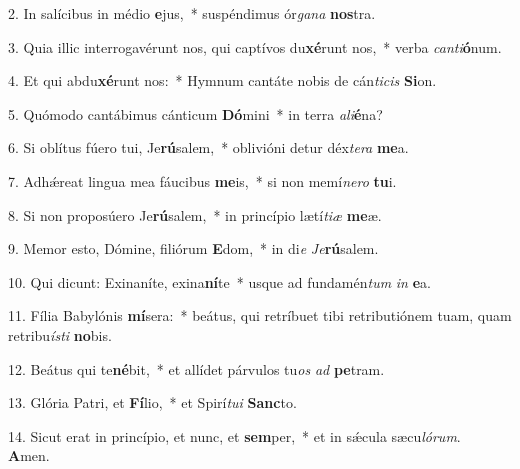 2. In salícibus in médio \textbf{e}jus,~*  suspéndimus ór\textit{ga}\textit{na} \textbf{nos}tra.\

3. Quia illic interrogavérunt nos, qui captívos du\textbf{xé}runt nos,~*  verba \textit{can}\textit{ti}\textbf{ó}num.\

4. Et qui abdu\textbf{xé}runt nos:~*  Hymnum cantáte nobis de cán\textit{ti}\textit{cis} \textbf{Si}on.\

5. Quómodo cantábimus cánticum \textbf{Dó}mini~*  in terra \textit{a}\textit{li}\textbf{é}na?\

6. Si oblítus fúero tui, Je\textbf{rú}salem,~*  oblivióni detur déx\textit{te}\textit{ra} \textbf{me}a.\

7. Adhǽreat lingua mea fáucibus \textbf{me}is,~*  si non memí\textit{ne}\textit{ro} \textbf{tu}i.\

8. Si non proposúero Je\textbf{rú}salem,~*  in princípio lætí\textit{ti}\textit{æ} \textbf{me}æ.\

9. Memor esto, Dómine, filiórum \textbf{E}dom,~*  in di\textit{e} \textit{Je}\textbf{rú}salem.\

10. Qui dicunt: Exinaníte, exina\textbf{ní}te~*  usque ad fundamén\textit{tum} \textit{in} \textbf{e}a.\

11. Fília Babylónis \textbf{mí}sera:~*  beátus, qui retríbuet tibi retributiónem tuam, quam retribu\textit{ís}\textit{ti} \textbf{no}bis.\

12. Beátus qui te\textbf{né}bit,~*  et allídet párvulos tu\textit{os} \textit{ad} \textbf{pe}tram.\

13. Glória Patri, et \textbf{Fí}lio,~*  et Spirí\textit{tu}\textit{i} \textbf{Sanc}to.\

14. Sicut erat in princípio, et nunc, et \textbf{sem}per,~*  et in sǽcula sæcu\textit{ló}\textit{rum}. \textbf{A}men.\

